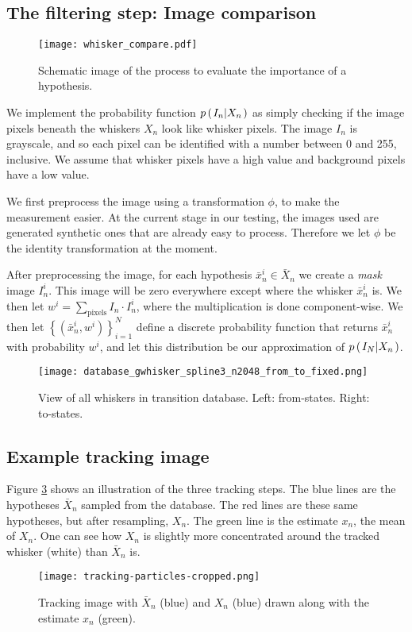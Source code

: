 \subsection*{The filtering step: Image comparison}

\begin{figure}
  \centering
  \texttt{[image: whisker\_compare.pdf]}
  \caption{Schematic image of the process to evaluate the importance of a hypothesis.}
  \label{fig:whisker_compare}
\end{figure}

We implement the probability function $p\left(\left. I_n \middle\vert X_n \right.\right)$ as simply checking if the image pixels beneath the whiskers $X_n$ look like whisker pixels. The image $I_n$ is grayscale, and so each pixel can be identified with a number between 0 and 255, inclusive. We assume that whisker pixels have a high value and background pixels have a low value.

We first preprocess the image using a transformation $\phi$, to make the measurement easier. At the current stage in our testing, the images used are generated synthetic ones that are already easy to process. Therefore we let $\phi$ be the identity transformation at the moment.

After preprocessing the image, for each hypothesis $\bar{x}_n^i \in \bar{X}_n$ we create a \emph{mask} image $I_n^i$. This image will be zero everywhere except where the whisker $\bar{x}_n^i$ is. We then let $w^i = \sum\limits_{\mathrm{pixels}}I_n \cdot I_n^i$, where the multiplication is done component-wise. We then let $\left\{\left(\bar{x}_n^i, w^i\right)\right\}_{i=1}^N$ define a discrete probability function that returns $\bar{x}_n^i$ with probability $w^i$, and let this distribution be our approximation of $p\left(\left. I_N \middle\vert X_n \right.\right)$.

\begin{figure}
  \centering
  \texttt{[image: database\_gwhisker\_spline3\_n2048\_from\_to\_fixed.png]}
  \caption{View of all whiskers in transition database. Left: from-states. Right: to-states.}
  \label{fig:database}
\end{figure}

\subsection*{Example tracking image}

Figure \ref{fig:particles} shows an illustration of the three tracking steps. The blue lines are the hypotheses $\bar{X}_n$ sampled from the database. The red lines are these same hypotheses, but after resampling, $X_n$. The green line is the estimate $x_n$, the mean of $X_n$. One can see how $X_n$ is slightly more concentrated around the tracked whisker (white) than $\bar{X}_n$ is.

\begin{figure}[h]
  \centering
  \texttt{[image: tracking-particles-cropped.png]}
  \caption{Tracking image with $\bar{X}_n$ (blue) and $X_n$ (blue) drawn along with the estimate $x_n$ (green).}
  \label{fig:particles}
\end{figure}

